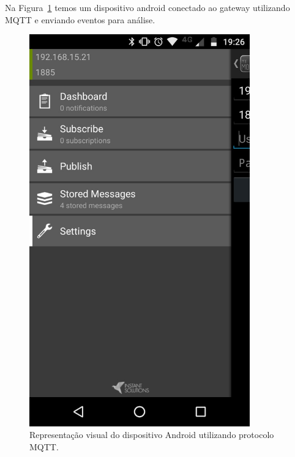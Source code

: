 Na Figura~\ref{fig:aplicativoAndroidMQTT} temos um dispositivo android conectado ao gateway utilizando MQTT e enviando eventos para análise.
\begin{figure}[h!]
	\begin{center}
		\includegraphics[width=0.85\textwidth]{./img/aplicativoAndroidMQTT}
		\caption{Representação visual do dispositivo Android utilizando protocolo MQTT.}
		\label{fig:aplicativoAndroidMQTT}
	\end{center}
\end{figure}

